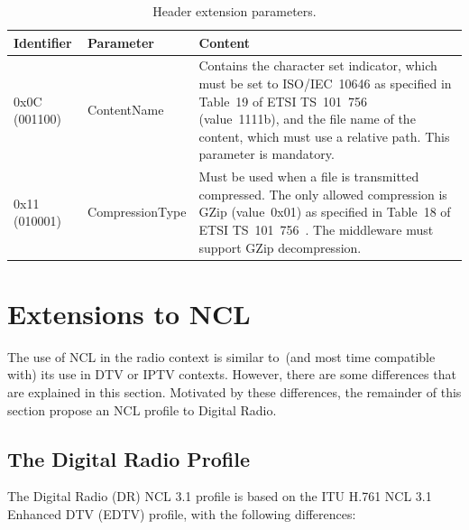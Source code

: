 \documentclass[11pt]{article}
\begin{document}
\begin{table}[H]
\centering
\caption{Header extension parameters.}
\label{context}
\begin{tabularx}{\textwidth}{|X|X|X|}
  \hline
  Identifier & Parameter & Content \\
  \hline
  0x0C (001100)
  & ContentName
  & Contains the character set indicator, which must be set to ISO/IEC~10646
  as specified in Table~19 of ETSI TS~101~756~\cite{ETSI-101756-2015}
  (value~1111b), and the file name of the content, which must use a relative
  path.  This parameter is mandatory.\\
  \hline
  0x11 (010001)
  & CompressionType
  & Must be used when a file is transmitted compressed.  The only allowed
  compression is GZip (value~0x01) as specified in Table~18 of ETSI
  TS~101~756~\cite{ETSI-101756-2015}.  The middleware must support GZip
  decompression.\\
  \hline
\end{tabularx}
\end{table}

\section{Extensions to NCL}
\label{sec:ncl_extensions}

The use of NCL in the radio context is similar to~(and most time compatible
with) its use in DTV or IPTV contexts. However, there are some differences that
are explained in this section. Motivated by these differences, the remainder of
this section propose an NCL profile to Digital Radio.

\subsection{The Digital Radio Profile}
The Digital Radio (DR) NCL 3.1 profile is based on the
ITU H.761 NCL 3.1 Enhanced DTV (EDTV) profile, with the following differences:
\end{document}
